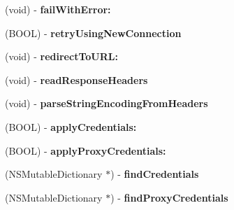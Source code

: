 \begin{DoxyCompactItemize}
\item 
\hypertarget{interface_a_s_i_h_t_t_p_request_a7c50c7dc79b3d7a4f7cdd646c15e02e6}{
(void) -\/ {\bfseries fail\-With\-Error\-:}}
\label{interface_a_s_i_h_t_t_p_request_a7c50c7dc79b3d7a4f7cdd646c15e02e6}

\item 
\hypertarget{interface_a_s_i_h_t_t_p_request_a36757b13199ccb943ca216f9723ba5e1}{
(\-B\-O\-O\-L) -\/ {\bfseries retry\-Using\-New\-Connection}}
\label{interface_a_s_i_h_t_t_p_request_a36757b13199ccb943ca216f9723ba5e1}

\item 
\hypertarget{interface_a_s_i_h_t_t_p_request_aed0a9ab6a8ca190bb26bb249c2a4ea50}{
(void) -\/ {\bfseries redirect\-To\-U\-R\-L\-:}}
\label{interface_a_s_i_h_t_t_p_request_aed0a9ab6a8ca190bb26bb249c2a4ea50}

\item 
\hypertarget{interface_a_s_i_h_t_t_p_request_abf63487739ee540915b40d3cace04c63}{
(void) -\/ {\bfseries read\-Response\-Headers}}
\label{interface_a_s_i_h_t_t_p_request_abf63487739ee540915b40d3cace04c63}

\item 
\hypertarget{interface_a_s_i_h_t_t_p_request_a4820891389ebf2eda587ff809b0e6bc2}{
(void) -\/ {\bfseries parse\-String\-Encoding\-From\-Headers}}
\label{interface_a_s_i_h_t_t_p_request_a4820891389ebf2eda587ff809b0e6bc2}

\item 
\hypertarget{interface_a_s_i_h_t_t_p_request_ade60b6e81c57c8ee8b616200ccb22930}{
(\-B\-O\-O\-L) -\/ {\bfseries apply\-Credentials\-:}}
\label{interface_a_s_i_h_t_t_p_request_ade60b6e81c57c8ee8b616200ccb22930}

\item 
\hypertarget{interface_a_s_i_h_t_t_p_request_a53e09e81268eb7230b4b5498ed2eb7d1}{
(\-B\-O\-O\-L) -\/ {\bfseries apply\-Proxy\-Credentials\-:}}
\label{interface_a_s_i_h_t_t_p_request_a53e09e81268eb7230b4b5498ed2eb7d1}

\item 
\hypertarget{interface_a_s_i_h_t_t_p_request_af337cbd50189506479260c6069ca2ded}{
(\-N\-S\-Mutable\-Dictionary $\ast$) -\/ {\bfseries find\-Credentials}}
\label{interface_a_s_i_h_t_t_p_request_af337cbd50189506479260c6069ca2ded}

\item 
\hypertarget{interface_a_s_i_h_t_t_p_request_aee0699cfb5ba5749a1461dfa56440121}{
(\-N\-S\-Mutable\-Dictionary $\ast$) -\/ {\bfseries find\-Proxy\-Credentials}}
\label{interface_a_s_i_h_t_t_p_request_aee0699cfb5ba5749a1461dfa56440121}


\end{DoxyCompactItemize}
